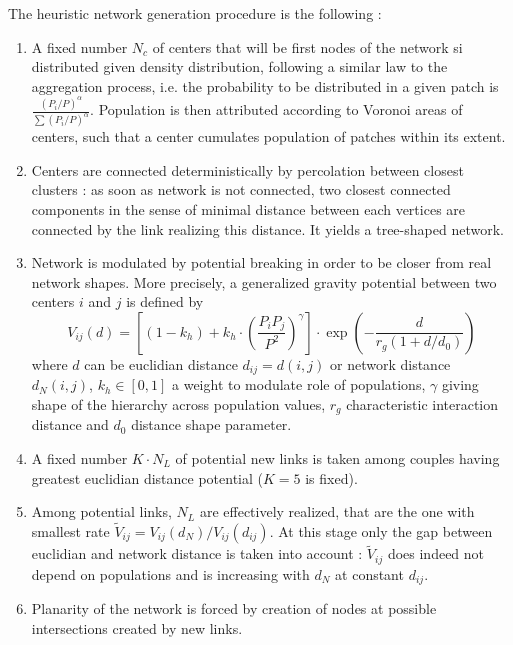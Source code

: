 
The heuristic network generation procedure is the following :
\begin{enumerate}
\item A fixed number $N_c$ of centers that will be first nodes of the network si distributed given density distribution, following a similar law to the aggregation process, i.e. the probability to be distributed in a given patch is $\frac{(P_i/P)^{\alpha}}{\sum (P_i/P)^{\alpha}}$. Population is then attributed according to Voronoi areas of centers, such that a center cumulates population of patches within its extent.
\item Centers are connected deterministically by percolation between closest clusters : as soon as network is not connected, two closest connected components in the sense of minimal distance between each vertices are connected by the link realizing this distance. It yields a tree-shaped network.
\item Network is modulated by potential breaking in order to be closer from real network shapes. More precisely, a generalized gravity potential between two centers $i$ and $j$ is defined by
\[
V_{ij}(d) = \left[ (1 - k_h) + k_h \cdot \left( \frac{P_i P_j}{P^2} \right)^{\gamma} \right]\cdot \exp{\left( -\frac{d}{r_g (1 + d/d_0)} \right)}
\]
where $d$ can be euclidian distance $d_{ij}=d(i,j)$ or network distance $d_N(i,j)$, $k_h \in [0,1]$ a weight to modulate role of populations, $\gamma$ giving shape of the hierarchy across population values, $r_g$ characteristic interaction distance and $d_0$ distance shape parameter.
\item A fixed number $K\cdot N_L$ of potential new links is taken among couples having greatest euclidian distance potential ($K=5$ is fixed).
\item Among potential links, $N_L$ are effectively realized, that are the one with smallest rate $\tilde{V}_{ij} = V_{ij}(d_N)/V_{ij}(d_{ij})$. At this stage only the gap between euclidian and network distance is taken into account : $\tilde{V}_{ij}$ does indeed not depend on populations and is increasing with $d_N$ at constant $d_{ij}$.
\item Planarity of the network is forced by creation of nodes at possible intersections created by new links.
\end{enumerate}



